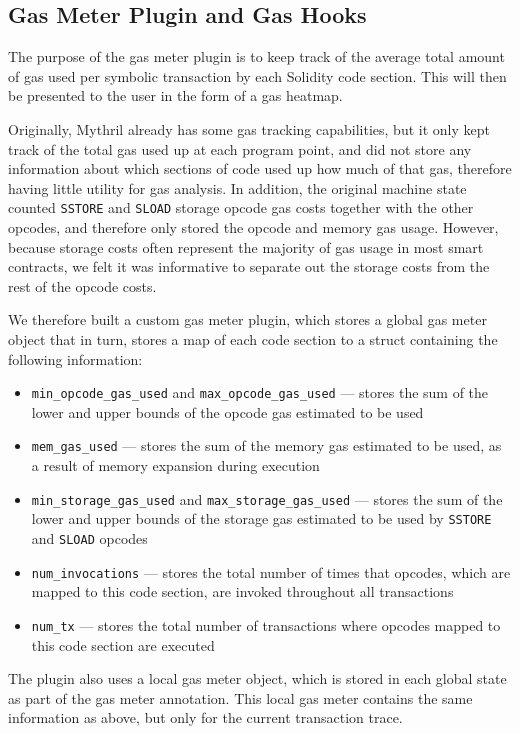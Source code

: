 \subsection{Gas Meter Plugin and Gas Hooks}

The purpose of the gas meter plugin is to keep track of the average total amount of gas 
used per symbolic transaction by each Solidity code section. This will then be presented to
the user in the form of a gas heatmap. 

Originally, Mythril already has some gas tracking
capabilities, but it only kept track of the total gas used up at each program point,
and did not store any information about which sections of code used up how much of that gas,
therefore having little utility for gas analysis. In addition, the original machine state
counted \texttt{SSTORE} and \texttt{SLOAD} storage opcode gas costs together with the other opcodes,
and therefore only stored the opcode and memory gas usage. However, because storage costs
often represent the majority of gas usage in most smart contracts, we felt it was 
informative to separate out the storage costs from the rest of the opcode costs.

We therefore built a custom gas meter plugin, which stores a global gas meter object that in turn,
stores a map of each code section to a struct containing the following information:

\begin{itemize}
  \item \texttt{min_opcode_gas_used} and \texttt{max_opcode_gas_used} --- stores the sum of the lower
  and upper bounds of the opcode gas estimated to be used
  \item \texttt{mem_gas_used} --- stores the sum of the memory gas estimated to be used,
  as a result of memory expansion during execution
  \item \texttt{min_storage_gas_used} and \texttt{max_storage_gas_used} --- stores the sum of the lower
  and upper bounds of the storage gas estimated to be used by \texttt{SSTORE} and \texttt{SLOAD} opcodes
  \item \texttt{num_invocations} --- stores the total number of times that opcodes, which are mapped to this code
  section, are invoked throughout all transactions
  \item \texttt{num_tx} --- stores the total number of transactions where opcodes mapped to this
  code section are executed
\end{itemize}

The plugin also uses a local gas meter object, which is stored in each global state as part of 
the gas meter annotation.
This local gas meter contains the same information as above, but only for the current transaction trace.

